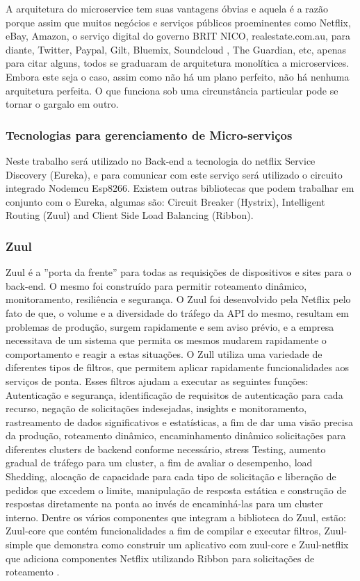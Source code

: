 \documentclass[journal]{IEEEtran}
\begin{document}
A arquitetura do microservice tem suas vantagens óbvias e aquela é a razão porque assim que muitos negócios e serviços públicos proeminentes como Netflix, eBay, Amazon, o serviço digital do governo BRIT NICO, realestate.com.au, para diante, Twitter, Paypal, Gilt, Bluemix, Soundcloud , The Guardian, etc, apenas para citar alguns, todos se graduaram de arquitetura monolítica a microservices. Embora este seja o caso, assim como não há um plano perfeito, não há nenhuma arquitetura perfeita. O que funciona sob uma circunstância particular pode se tornar o gargalo em outro.

\subsubsection{Tecnologias para gerenciamento de Micro-serviços}
Neste trabalho será utilizado no Back-end a tecnologia do netflix Service Discovery (Eureka), e para comunicar com este serviço será utilizado o circuito integrado Nodemcu Esp8266. Existem outras bibliotecas que podem trabalhar em conjunto com o Eureka, algumas são: Circuit Breaker (Hystrix), Intelligent Routing (Zuul) and Client Side Load Balancing (Ribbon). 

\subsubsection{Zuul}
Zuul é a ''porta da frente'' para todas as requisições de dispositivos e sites para o back-end. O mesmo foi construído para permitir roteamento dinâmico, monitoramento, resiliência e segurança. O Zuul foi desenvolvido pela Netflix pelo fato de que, o volume e a diversidade do tráfego da API do mesmo, resultam em problemas de produção, surgem rapidamente e sem aviso prévio, e a empresa necessitava de um sistema que permita os mesmos mudarem rapidamente o comportamento e reagir a estas situações.
O Zull utiliza uma variedade de diferentes tipos de filtros, que permitem aplicar rapidamente funcionalidades aos serviços de ponta. Esses filtros ajudam a executar as seguintes funções: Autenticação e segurança, identificação de requisitos de autenticação para cada recurso, negação de solicitações indesejadas, insights e monitoramento, rastreamento de dados significativos e estatísticas, a fim de dar uma visão precisa da produção, roteamento dinâmico, encaminhamento dinâmico solicitações para diferentes clusters de backend conforme necessário, stress Testing, aumento gradual de tráfego para um cluster, a fim de avaliar o desempenho, load Shedding, alocação de capacidade para cada tipo de solicitação e liberação de pedidos que excedem o limite, manipulação de resposta estática e construção de respostas diretamente na ponta ao invés de encaminhá-las para um cluster interno.
Dentre os vários componentes que integram a biblioteca do Zuul, estão: Zuul-core que contém funcionalidades a fim de compilar e executar filtros, Zuul-simple que demonstra como construir um aplicativo com zuul-core e Zuul-netflix que adiciona componentes Netflix utilizando Ribbon para solicitações de roteamento \cite{netflix2016Zuul}.
\end{document}
